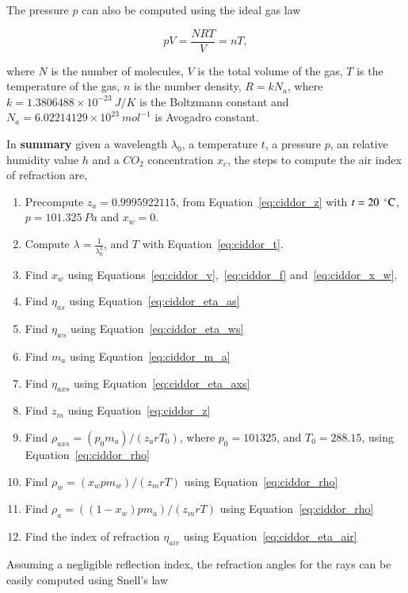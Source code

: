 The pressure $p$ can also be computed using the ideal gas law

\begin{equation}
\label{eq:ciddor_p}
pV=\frac{NRT}{V} = n T,
\end{equation}

where $N$ is the number of molecules, $V$ is the total volume of the gas, $T$ is the temperature of the gas, $n$ is the number density, $R = k N_a$, where $k = 1.3806488 \times 10^{-23}~J/K$ is the Boltzmann constant and $N_a = 6.02214129 \times 10^{23}~mol^{-1}$ is Avogadro constant.

In \textbf{summary} given a wavelength $\lambda_0$, a temperature $t$, a pressure $p$, an relative humidity value $h$ and a $CO_2$ concentration $x_c$, the steps to compute the air index of refraction are,

\begin{enumerate}
\item Precompute $z_a = 0.9995922115$, from Equation~\ref{eq:ciddor_z} with $t = 20~\,^{\circ}{\rm C}$, $p = 101.325~Pa$ and $x_w=0$.
\item Compute $\lambda = \frac{1}{\lambda_0^2}$, and $T$ with Equation~\ref{eq:ciddor_t}.
\item Find $x_w$ using Equations~\ref{eq:ciddor_v},~\ref{eq:ciddor_f} and~\ref{eq:ciddor_x_w}. 
\item Find $\eta_{as}$ using Equation~\ref{eq:ciddor_eta_as}
\item Find $\eta_{ws}$ using Equation~\ref{eq:ciddor_eta_ws}
\item Find $m_a$ using Equation~\ref{eq:ciddor_m_a}
\item Find $\eta_{axs}$ using Equation~\ref{eq:ciddor_eta_axs}
\item Find $z_m$ using Equation~\ref{eq:ciddor_z}
\item Find $\rho_{axs} = (p_0 m_a)/(z_a r T_0)$, where $p_0 = 101325$, and $T_0 = 288.15$, using Equation~\ref{eq:ciddor_rho}
\item Find $\rho_{w} = (x_w p m_w)/(z_m r T)$ using Equation~\ref{eq:ciddor_rho}
\item Find $\rho_{a} = ((1 - x_w) p m_a)/(z_m r T)$ using Equation~\ref{eq:ciddor_rho}
\item Find the index of refraction $\eta_{air}$ using Equation~\ref{eq:ciddor_eta_air}
\end{enumerate} 

Assuming a negligible reflection index, the refraction angles for the rays can be easily computed using Snell's law

